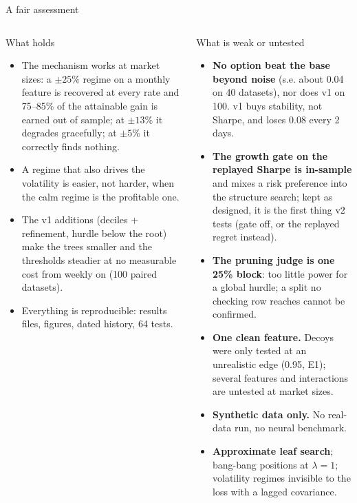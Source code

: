 \documentclass[10pt,aspectratio=169]{beamer}
\newcommand{\1}{\mathbf{1}}
\begin{document}
\begin{frame}{A fair assessment}
\footnotesize
\begin{columns}[T]
\begin{block}{What holds}
\begin{itemize}
\item The mechanism works at market sizes: a $\pm25\%$ regime on a monthly feature is recovered at every rate and 75--85\% of the attainable gain is earned out of sample; at $\pm13\%$ it degrades gracefully; at $\pm5\%$ it correctly finds nothing.
\item A regime that also drives the volatility is easier, not harder, when the calm regime is the profitable one.
\item The v1 additions (deciles + refinement, hurdle below the root) make the trees smaller and the thresholds steadier at no measurable cost from weekly on (100 paired datasets).
\item Everything is reproducible: results files, figures, dated history, 64 tests.
\end{itemize}
\end{block}
\begin{block}{What is weak or untested}
\begin{itemize}
\item \textbf{No option beat the base beyond noise} (s.e. about 0.04 on 40 datasets), nor does v1 on 100. v1 buys stability, not Sharpe, and loses $0.08$ every 2 days.
\item \textbf{The growth gate on the replayed Sharpe is in-sample} and mixes a risk preference into the structure search; kept as designed, it is the first thing v2 tests (gate off, or the replayed regret instead).
\item \textbf{The pruning judge is one 25\% block}: too little power for a global hurdle; a split no checking row reaches cannot be confirmed.
\item \textbf{One clean feature.} Decoys were only tested at an unrealistic edge (0.95, E1); several features and interactions are untested at market sizes.
\item \textbf{Synthetic data only.} No real-data run, no neural benchmark.
\item \textbf{Approximate leaf search}; bang-bang positions at $\lambda=1$; volatility regimes invisible to the loss with a lagged covariance.
\end{itemize}
\end{block}
\end{columns}
\end{frame}
\end{document}
